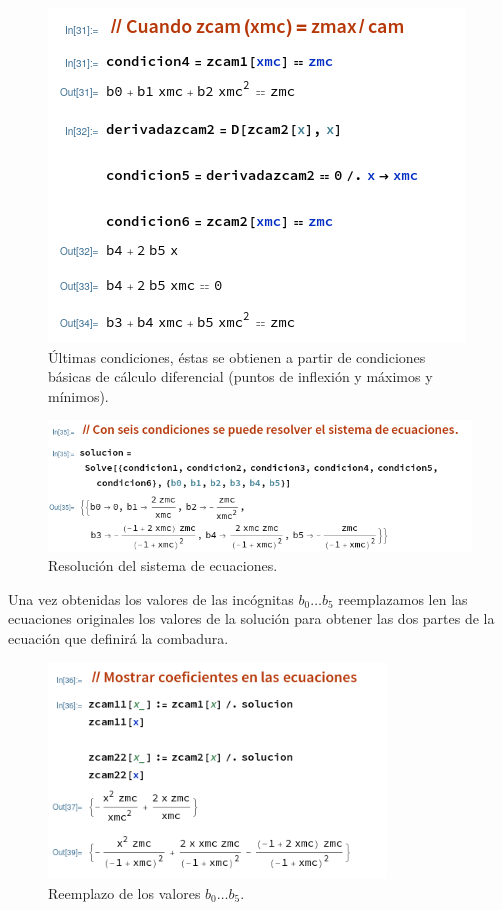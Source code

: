 \documentclass[12pt, letterpaper]{article}
\begin{document}
\begin{figure}[H]
	\centering
	\includegraphics[width=\textwidth]{4.png}
	\caption{Últimas condiciones, éstas se obtienen a partir de condiciones básicas de cálculo diferencial (puntos de inflexión y máximos y mínimos).}
\end{figure}

\begin{figure}[H]
	\centering
	\includegraphics[width=\textwidth]{5.png}
	\caption{Resolución del sistema de ecuaciones.}
\end{figure}

Una vez obtenidas los valores de las incógnitas $b_0 \hdots b_5$ reemplazamos len las ecuaciones originales los valores de la solución para obtener las dos partes de la ecuación que definirá la combadura.

\begin{figure}[H]
	\centering
	\includegraphics[width=0.8\textwidth]{6.png}
	\caption{Reemplazo de los valores $b_0 \hdots b_5$.}
\end{figure}
\end{document}
